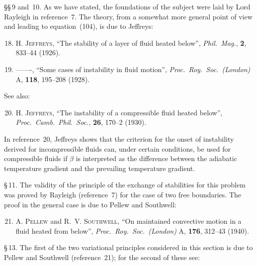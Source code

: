 \noindent \S\S\,9 and~10. As we have stated, the foundations of the subject were laid by Lord
Rayleigh in reference~7. The theory, from a somewhat more general point of
view and leading to equation~(104), is due to Jeffreys:

\begin{enumerate}
\setcounter{enumi}{17}

\item H. \textsc{Jeffreys}, ``The stability of a layer of fluid heated below'',
  \textit{Phil.\ Mag.}, \textbf{2}, 833--44 (1926).

\item -------, ``Some cases of instability in fluid motion'',
  \textit{Proc.\ Roy.\ Soc.\ (London)} A, \textbf{118}, 195--208 (1928).

\end{enumerate}

\noindent See also:

\begin{enumerate}
\setcounter{enumi}{19}

\item H. \textsc{Jeffreys}, ``The instability of a compressible fluid heated below'',
  \textit{Proc.\ Camb.\ Phil.\ Soc.}, \textbf{26}, 170--2 (1930).

\end{enumerate}

\noindent In reference~20, Jeffreys shows that the criterion for the onset of instability
derived for incompressible fluids can, under certain conditions, be used for
compressible fluids if $\beta$ is interpreted as the difference between the adiabatic
temperature gradient and the prevailing temperature gradient.

\noindent \S\,11. The validity of the principle of the exchange of stabilities for this problem
was proved by Rayleigh (reference~7) for the case of two free boundaries. The
proof in the general case is due to Pellew and Southwell:

\begin{enumerate}
\setcounter{enumi}{20}

\item A. \textsc{Pellew} and R.~V. \textsc{Southwell}, ``On maintained convective motion in
  a fluid heated from below'', \textit{Proc.\ Roy.\ Soc.\ (London)} A, \textbf{176},
  312--43 (1940).

\end{enumerate}

\noindent \S\,13. The first of the two variational principles considered in this section is due
to Pellew and Southwell (reference~21); for the second of these see:

